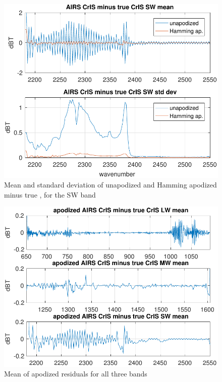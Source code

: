 \documentclass[10pt,twocolumn]{article}  %
\begin{document}
\begin{figure} %
  \centering
  \includegraphics[width=\linewidth]{figures/a2cris_diff_SW.pdf}
  \caption{Mean and standard deviation of unapodized and Hamming
    apodized {\airs} {\cris} minus true {\cris}, for the {\cris} SW
    band}
  \label{diffSW}
\end{figure}

\begin{figure} %
  \centering
  \includegraphics[width=\linewidth]{figures/a2cris_diff_all.pdf}
  \caption{Mean of apodized residuals for all three {\cris} bands}
  \label{meanAll}
\end{figure}
\end{document}
